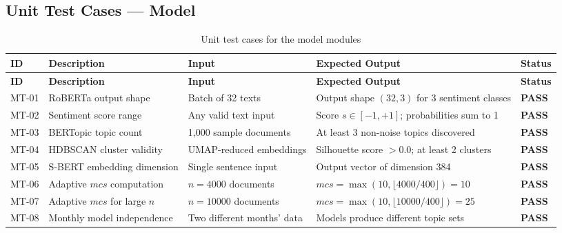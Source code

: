 \documentclass[12pt, letterpaper]{article}
\begin{document}
\subsection{Unit Test Cases --- Model}

\begin{longtable}{p{1cm} p{3.8cm} p{3.2cm} p{3.2cm} p{1.5cm}}
  \caption{Unit test cases for the model modules}
  \label{tab:unit_tests_model} \\
  \toprule
  \textbf{ID} & \textbf{Description} & \textbf{Input} & \textbf{Expected Output} & \textbf{Status} \\
  \midrule
  \endfirsthead
  \toprule
  \textbf{ID} & \textbf{Description} & \textbf{Input} & \textbf{Expected Output} & \textbf{Status} \\
  \midrule
  \endhead
  \bottomrule
  \endlastfoot
  MT-01 & RoBERTa output shape          & Batch of 32 texts            & Output shape $(32, 3)$ for 3 sentiment classes & \textcolor{commentgreen}{\textbf{PASS}} \\[4pt]
  MT-02 & Sentiment score range          & Any valid text input          & Score $s \in [-1, +1]$; probabilities sum to 1 & \textcolor{commentgreen}{\textbf{PASS}} \\[4pt]
  MT-03 & BERTopic topic count           & 1,000 sample documents        & At least 3 non-noise topics discovered & \textcolor{commentgreen}{\textbf{PASS}} \\[4pt]
  MT-04 & HDBSCAN cluster validity       & UMAP-reduced embeddings       & Silhouette score $> 0.0$; at least 2 clusters & \textcolor{commentgreen}{\textbf{PASS}} \\[4pt]
  MT-05 & S-BERT embedding dimension     & Single sentence input         & Output vector of dimension 384 & \textcolor{commentgreen}{\textbf{PASS}} \\[4pt]
  MT-06 & Adaptive $mcs$ computation     & $n = 4000$ documents          & $mcs = \max(10, \lfloor 4000/400 \rfloor) = 10$ & \textcolor{commentgreen}{\textbf{PASS}} \\[4pt]
  MT-07 & Adaptive $mcs$ for large $n$   & $n = 10000$ documents         & $mcs = \max(10, \lfloor 10000/400 \rfloor) = 25$ & \textcolor{commentgreen}{\textbf{PASS}} \\[4pt]
  MT-08 & Monthly model independence     & Two different months' data     & Models produce different topic sets & \textcolor{commentgreen}{\textbf{PASS}} \\
\end{longtable}
\end{document}
